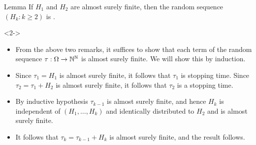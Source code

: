 \documentclass[12pt,aspectratio=169]{beamer}
\begin{document}
\begin{frame}
\begin{block}{Lemma}
If $H_1$ and $H_2$ are almost surely finite, 
then the random sequence $(H_k: k \ge 2)$ is \iid.
\end{block}

\begin{Proof}<2->
\begin{itemize}
\item <2-> From the above two remarks, it suffices to show that each term of the random sequence $\tau:\Omega\to\mathbb{N}^{\mathbb{N}}$ is almost surely finite. 
We will show this by induction. 
\item <3-> Since $\tau_1 = H_1$ is almost surely finite, it follows that $\tau_1$ is stopping time. 
Since $\tau_2 = \tau_1+ H_2$ is almost surely finite,  it follows that $\tau_2$ is a stopping time. 
\item <4-> By inductive hypothesis $\tau_{k-1}$ is almost surely finite, 
and hence $H_k$ is independent of $(H_1, \dots, H_k)$ and identically distributed to $H_2$ and is almost surely finite. 
\item <5-> It follows that $\tau_k = \tau_{k-1} + H_k$ is almost surely finite, 
and the result follows. %
\end{itemize}
\end{Proof}
\end{frame}
\end{document}
